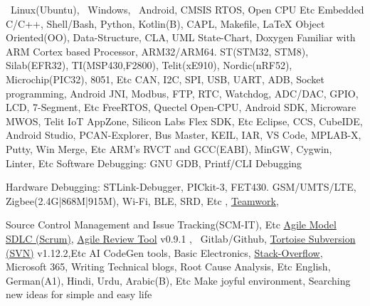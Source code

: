 
\begin{rubric}{}

   \faLinux\ Linux(Ubuntu), \faWindows\ Windows, \faAndroid\ Android, CMSIS RTOS, Open CPU Etc
	Embedded C/C++, Shell/Bash, Python, Kotlin(B), CAPL, Makefile, \LaTeX
\vspace*{1mm}
	Object Oriented(OO), Data-Structure, CLA, \iftrue UML State-Chart, \fi Doxygen
\vspace*{1mm}
	Familiar with ARM Cortex based Processor, ARM32/ARM64.
\vspace*{1mm}
	ST(STM32, STM8), Silab(EFR32), TI(MSP430,F2800), Telit(xE910), Nordic(nRF52), Microchip(PIC32), 8051, Etc
\vspace*{1mm}
	CAN, I2C, SPI, USB, UART, ADB, Socket programming, Android JNI, Modbus, FTP, RTC, Watchdog, ADC/DAC, GPIO, LCD, 7-Segment, Etc
\entry*[SDK]
	FreeRTOS, Quectel Open-CPU, Android SDK, Microware MWOS, Telit IoT AppZone, Silicon Labs Flex SDK, Etc
	Eclipse, CCS, CubeIDE, Android Studio, PCAN-Explorer, Bus Master, KEIL, IAR, VS Code, MPLAB-X, Putty, Win Merge, Etc
\entry*[SW Toolchains]
    ARM’s RVCT and GCC(EABI), MinGW, Cygwin, Linter, Etc
	Software Debugging: GNU GDB, Printf/CLI Debugging\par
	Hardware Debugging: STLink-Debugger, PICkit-3, FET430.
\entry*[RF Modules]
	GSM/UMTS/LTE, Zigbee(2.4G|868M|915M), \faWifi Wi-Fi, \faBluetooth BLE, SRD, Etc
,
    \href{https://www.teamwork.com/}{Teamwork},\par
    Source Control Management and Issue Tracking(SCM-IT), Etc
    \href{https://www.scrum.org/}{Agile Model SDLC (Scrum)}, \href{https://agilereview.org/}{Agile Review Tool} v0.9.1 
 \vspace*{1mm}  
    \href{https://git-scm.com/}{\faGit},  \faGithub\ Gitlab/Github,
    \href{https://tortoisesvn.net/}{Tortoise Subversion (SVN)} v1.12.2,Etc
\entry*[Miscellaneous]
    AI CodeGen tools, Basic Electronics, \href{https://stackoverflow.com/}{Stack-Overflow}, Microsoft 365, Writing Technical blogs, Root Cause Analysis, Etc
\vspace*{1mm}	
	English, German(A1), Hindi, Urdu, Arabic(B), \iffalse Gujarati,\fi Etc
\vspace*{1mm}	
	Make joyful environment, Searching new ideas for simple and easy life
\vspace*{5mm}
\end{rubric}
